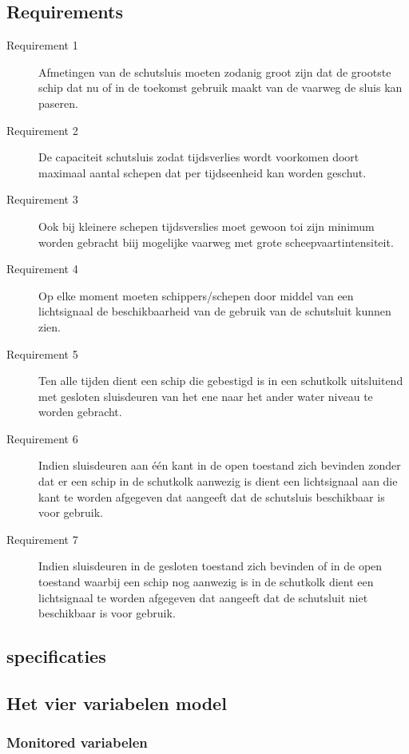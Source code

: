 \documentclass{article}
\begin{document}
\subsection{Requirements}
\begin{description}
\item [Requirement 1] Afmetingen van de schutsluis moeten zodanig groot zijn dat de grootste schip dat nu of in de toekomst
gebruik maakt van de vaarweg de sluis kan paseren.
\item [Requirement 2] De capaciteit schutsluis zodat tijdsverlies wordt voorkomen doort maximaal aantal schepen dat
per tijdseenheid kan worden geschut.
\item [Requirement 3] Ook bij kleinere schepen tijdsverslies moet gewoon toi zijn minimum worden gebracht biij mogelijke vaarweg met grote
scheepvaartintensiteit.
\item [Requirement 4] Op elke moment moeten schippers/schepen door middel van een lichtsignaal de beschikbaarheid van de gebruik
van de schutsluit kunnen zien.
\item [Requirement 5] Ten alle tijden dient een schip die gebestigd is in een schutkolk uitsluitend met gesloten sluisdeuren van het
ene naar het ander water niveau te worden gebracht.
\item [Requirement 6] Indien sluisdeuren aan één kant in de open toestand zich bevinden zonder dat er een schip
in de schutkolk aanwezig is dient een lichtsignaal aan die kant te worden afgegeven dat aangeeft dat de schutsluis beschikbaar is voor gebruik.
\item [Requirement 7] Indien sluisdeuren in de gesloten toestand zich bevinden of in de open toestand waarbij een schip nog
aanwezig is in de schutkolk dient een lichtsignaal te worden afgegeven dat aangeeft dat de schutsluit niet beschikbaar is voor gebruik.
\end{description}

\newpage
\subsection{specificaties}

\subsection{Het vier variabelen model}
\subsubsection{Monitored variabelen}
\end{document}
